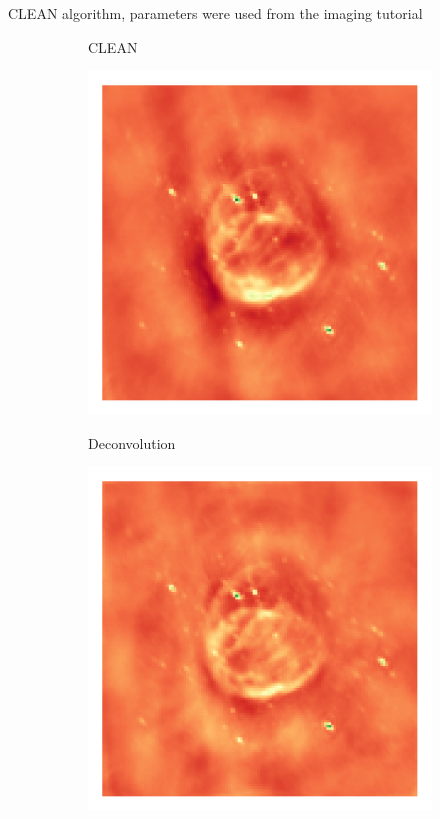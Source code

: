 CLEAN algorithm, parameters were used from the imaging tutorial \cite{casaImagingGuide}
\begin{figure}[h]
	\centering
	\begin{subfigure}[b]{0.3\linewidth}
		\begin{center}CLEAN\end{center}
		\includegraphics[width=\linewidth, trim={18px 19px 18px 18px}, clip]{./chapters/05.results/g55/clean_image.png}
	\end{subfigure}
	\begin{subfigure}[b]{0.3\linewidth}
		\begin{center}Deconvolution\end{center}
		\includegraphics[width=\linewidth, trim={18px 19px 18px 18px}, clip]{./chapters/05.results/g55/positive_deconv_image.png}

\end{subfigure}
\end{figure}
